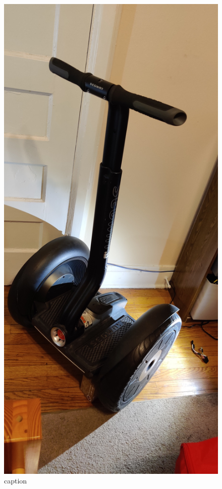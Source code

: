 \documentclass[]{formalLabReport}
\begin{document}
\begin{figure}
    \includegraphics[]{segwayFront.jpg}
    \caption{caption}
    \label{fig:segwayFront.jpg}
\end{figure}
\end{document}
